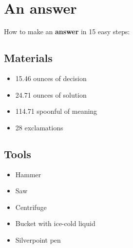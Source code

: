 \documentclass{article}
\begin{document}
\section{An answer}How to make an \textbf{answer} in 15 easy steps:

\subsection{Materials}\begin{itemize}
\item 
15.46 ounces of decision
\item 
24.71 ounces of solution
\item 
114.71 spoonful of meaning
\item 
28 exclamations
\end{itemize}
\subsection{Tools}\begin{itemize}
\item 
Hammer
\item 
Saw
\item 
Centrifuge
\item 
Bucket with ice-cold liquid
\item 
Silverpoint pen
\end{itemize}
\end{document}
